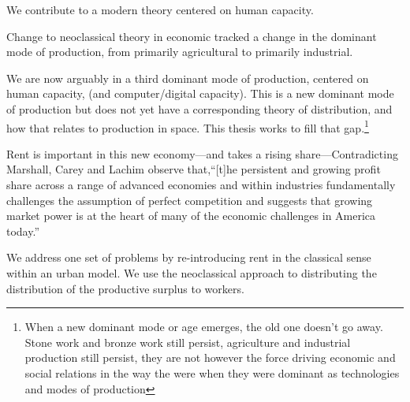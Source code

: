 We contribute to a modern theory centered on human capacity.

Change to neoclassical theory in economic tracked a change in the dominant mode of production, from primarily agricultural to primarily industrial.

We are now arguably in a third dominant mode of production, centered on  human capacity, (and computer/digital capacity). This is a new dominant mode of production but does not yet have a corresponding theory of distribution, and how that relates to production in space. 
This thesis works to fill that gap.\footnote{When a new dominant mode or age emerges, the old one doesn't go away. Stone work and bronze work still persist, agriculture and industrial production still persist, they are not however the force driving economic and social relations in the way the were when they were dominant as technologies and modes of production\cite{oldworldsdon'tdie}}

Rent is important in this new economy---and takes a rising share---Contradicting Marshall, Carey and Lachim \cite{careySomethingNothingHow2019} observe that,``[t]he persistent and growing profit share across a range of advanced economies and within industries fundamentally challenges the assumption of perfect competition and suggests that growing market power is at the heart of many of the economic challenges in America today.''


We address one set of problems by re-introducing rent in the classical sense within an urban model. 
We  use the neoclassical approach to distributing the distribution of the productive surplus to workers.

 
 
